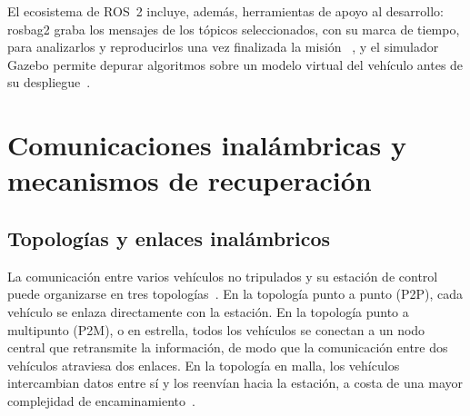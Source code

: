 El ecosistema de ROS~2 incluye, además, herramientas de apoyo al desarrollo: rosbag2
graba los mensajes de los tópicos seleccionados, con su marca de tiempo, para analizarlos
y reproducirlos una vez finalizada la misión~\cite{sears2024} \cite{Cite18}, y el simulador
Gazebo permite depurar algoritmos sobre un modelo virtual del vehículo antes de su
despliegue~\cite{aliane2026}.
 
 
\section{Comunicaciones inalámbricas y mecanismos de recuperación}
\label{sec:comunicaciones}
 
\subsection{Topologías y enlaces inalámbricos}
\label{subsec:topologias}
 
La comunicación entre varios vehículos no tripulados y su estación de control puede
organizarse en tres topologías~\cite{Cite26}. En la topología punto a punto (P2P), cada
vehículo se enlaza directamente con la estación. En la topología punto a multipunto
(P2M), o en estrella, todos los vehículos se conectan a un nodo central que retransmite
la información, de modo que la comunicación entre dos vehículos atraviesa dos enlaces.
En la topología en malla, los vehículos intercambian datos entre sí y los reenvían hacia
la estación, a costa de una mayor complejidad de encaminamiento~\cite{Cite26}.
 
